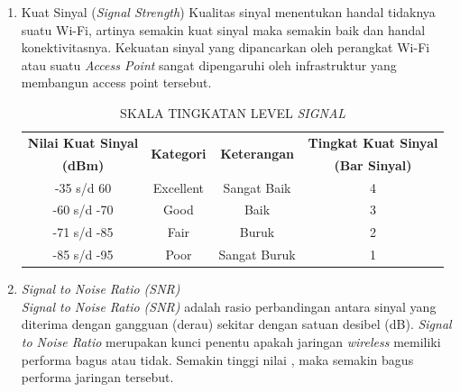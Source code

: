 \documentclass[conference]{IEEEtran}
\begin{document}
\begin{enumerate}
    \item Kuat Sinyal (\textit{Signal Strength}) Kualitas sinyal menentukan handal tidaknya suatu Wi-Fi, artinya semakin kuat sinyal maka semakin baik dan handal konektivitasnya. Kekuatan sinyal yang dipancarkan oleh perangkat Wi-Fi atau suatu \textit{Access Point} sangat dipengaruhi oleh infrastruktur yang membangun access point tersebut.
    
    \begin{table}[htbp]
        \caption{SKALA TINGKATAN LEVEL \textit{SIGNAL}}
        \label{tab1}
        \centering
        \begin{tabular}{|c|c|c|c|}
        \hline
        \textbf{Nilai Kuat Sinyal} & \multirow{2}{*}{\textbf{Kategori}} & \multirow{2}{*}{\textbf{Keterangan}} & \textbf{Tingkat Kuat Sinyal} \\
        \textbf{(dBm)} &  &  & \textbf{(Bar Sinyal)}\\
        \hline
        -35 s/d 60 & Excellent & Sangat Baik & 4 \\ \hline
        -60 s/d -70 & Good & Baik & 3 \\ \hline
        -71 s/d -85 & Fair & Buruk & 2 \\ \hline
        -85 s/d -95 & Poor & Sangat Buruk & 1\\
        \hline
        \end{tabular}
    \end{table}
    
    \item \textit{Signal to Noise Ratio (SNR)}\\
    \textit{Signal to Noise Ratio (SNR)} adalah rasio perbandingan antara sinyal yang diterima dengan gangguan (derau) sekitar dengan satuan desibel (dB). \textit{Signal to Noise Ratio} merupakan kunci penentu apakah jaringan \textit{wireless} memiliki performa bagus atau tidak. Semakin tinggi nilai , maka semakin bagus performa jaringan tersebut.
    

\end{enumerate}
\end{document}
